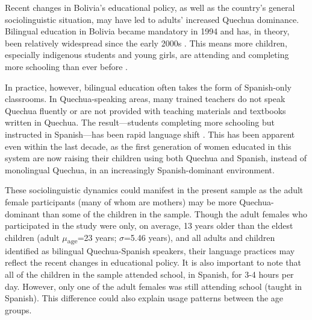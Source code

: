 \documentclass[a4paper,man,floatsintext,natbib,donotrepeattitle, apacite]{apa6}
\begin{document}
Recent changes in Bolivia's educational policy, as well as the country's general sociolinguistic situation, may have led to adults' increased Quechua dominance. Bilingual education in Bolivia became mandatory in 1994 and has, in theory, been relatively widespread since the early 2000s \citep{bensonBilingualSchoolingMozambique2004}. This means more children, especially indigenous students and young girls, are attending and completing more schooling than ever before \citep{hornbergerMultilingualEducationPolicy2009}. 

In practice, however, bilingual education often takes the form of Spanish-only classrooms. In Quechua-speaking areas, many trained teachers do not speak Quechua fluently or are not provided with teaching materials and textbooks written in Quechua. The result---students completing more schooling but instructed in Spanish---has been rapid language shift \citep{hornbergerLanguageRevitalisationAndes1996}. This has been apparent even within the last decade, as the first generation of women educated in this system are now raising their children using both Quechua and Spanish, instead of monolingual Quechua, in an increasingly Spanish-dominant environment. 

These sociolinguistic dynamics could manifest in the present sample as the adult female participants (many of whom are mothers) may be more Quechua-dominant than some of the children in the sample. Though the adult females who participated in the study were only, on average, 13 years older than the eldest children (adult $\mu$\textsubscript{age}=23 years; $\sigma$=5.46 years), and all adults and children identified as bilingual Quechua-Spanish speakers, their language practices may reflect the recent changes in educational policy. It is also important to note that all of the children in the sample attended school, in Spanish, for 3-4 hours per day. However, only one of the adult females was still attending school (taught in Spanish). This difference could also explain usage patterns between the age groups.
\end{document}
